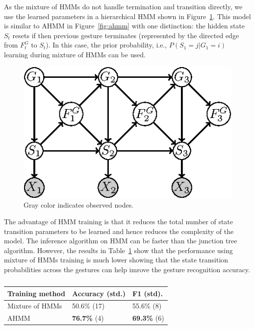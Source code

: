 \documentclass{sigchi}
\newcommand\tabhead[1]{\small\textbf{#1}}
\begin{document}
As the mixture of HMMs do not handle termination and transition directly, we use
the learned parameters in a hierarchical HMM shown in
Figure~\ref{fig:ahmm-reset}. This model is similar to AHMM in
Figure~\ref{fig:ahmm} with one distinction: the hidden state $S_t$ resets if
then previous gesture terminates (represented by the directed edge from $F_t^G$
to $S_t$). In this case, the prior probability, i.e., $P(S_1 = j | G_1 = i)$
learning during mixture of HMMs can be used.

\begin{figure}
\centering
\includegraphics[]{figure/ahmm-reset.eps}
\caption{Gray color indicates observed nodes.}
\label{fig:ahmm-reset}
\end{figure}

The advantage of HMM training is that it reduces the total number of
state transition parameters to be learned and hence reduces the
complexity of the model. The inference algorithm on HMM can be faster than
the junction tree algorithm. However, the results in Table~\ref{tab:training}
show that the performance using mixture of HMMs training is much lower showing
that the state transition probabilities across the gestures can help imrove the
gesture recognition accuracy.

\begin{table}[t]
\centering
\begin{tabular}{|l|l|l|}
\hline
\tabhead{Training method} & {\tabhead{Accuracy (std.)}} & {\tabhead{F1 (std).}}\\
\hline
Mixture of HMMs & 50.6\% (17) & 55.6\% (8) \\
\hline
AHMM & \textbf{76.7\%} (4) & \textbf{69.3\%} (6) \\
\hline
\end{tabular}
\caption{}
\label{tab:training}
\end{table}
\end{document}

